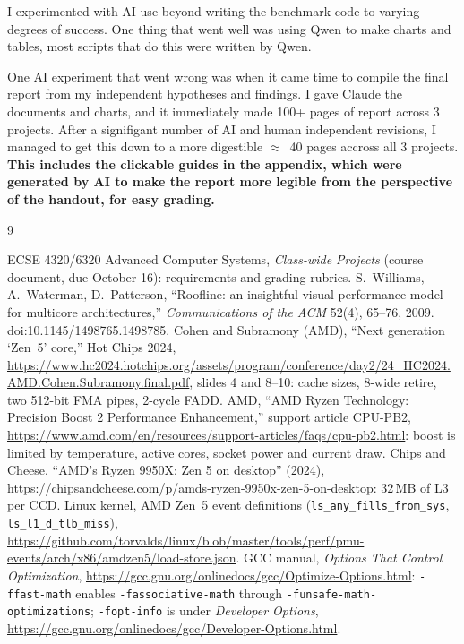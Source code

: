 \documentclass{article}
\begin{document}
 I experimented with AI use beyond writing the benchmark code to varying degrees of success. One thing that went well was using Qwen to make charts and tables, most scripts that do this were written by Qwen.

 One AI experiment that went wrong was when it came time to compile the final report from my independent hypotheses and findings. I gave Claude the documents and charts, and it immediately made 100+ pages of report across 3 projects. After a signifigant number of AI and human independent revisions, I managed to get this down to a more digestible $\approx$~40 pages accross all 3 projects. \textbf{This includes the clickable guides in the appendix, which were generated by AI to make the report more legible from the perspective of the handout, for easy grading.}


\begin{thebibliography}{9}
\raggedright\small
{} ECSE 4320/6320 Advanced Computer Systems, \emph{Class-wide Projects} (course document, due October 16): requirements and grading rubrics.
 S.~Williams, A.~Waterman, D.~Patterson, ``Roofline: an insightful visual performance model for multicore architectures,'' \emph{Communications of the ACM} 52(4), 65--76, 2009. doi:10.1145/1498765.1498785.
 Cohen and Subramony (AMD), ``Next generation `Zen~5' core,'' Hot Chips 2024, \url{https://www.hc2024.hotchips.org/assets/program/conference/day2/24_HC2024.AMD.Cohen.Subramony.final.pdf}, slides 4 and 8--10: cache sizes, 8-wide retire, two 512-bit FMA pipes, 2-cycle FADD.
 AMD, ``AMD Ryzen Technology: Precision Boost 2 Performance Enhancement,'' support article CPU-PB2, \url{https://www.amd.com/en/resources/support-articles/faqs/cpu-pb2.html}: boost is limited by temperature, active cores, socket power and current draw.
 Chips and Cheese, ``AMD's Ryzen 9950X: Zen 5 on desktop'' (2024), \url{https://chipsandcheese.com/p/amds-ryzen-9950x-zen-5-on-desktop}: 32\,MB of L3 per CCD.
 Linux kernel, AMD Zen~5 event definitions (\texttt{ls\_any\_fills\_from\_sys}, \texttt{ls\_l1\_d\_tlb\_miss}), \url{https://github.com/torvalds/linux/blob/master/tools/perf/pmu-events/arch/x86/amdzen5/load-store.json}.
 GCC manual, \emph{Options That Control Optimization}, \url{https://gcc.gnu.org/onlinedocs/gcc/Optimize-Options.html}: \texttt{-ffast-math} enables \texttt{-fassociative-math} through \texttt{-funsafe-math-optimizations}; \texttt{-fopt-info} is under \emph{Developer Options}, \url{https://gcc.gnu.org/onlinedocs/gcc/Developer-Options.html}.
\end{thebibliography}
\end{document}
